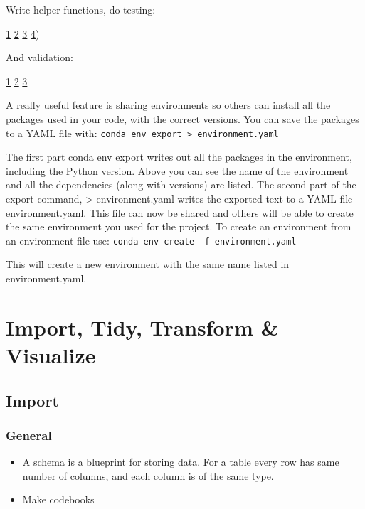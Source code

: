 \documentclass[]{book}
\begin{document}
Write helper functions, do testing:

\href{http://engineering.pivotal.io/post/test-driven-development-for-data-science/}{1}
\textbar{} \href{http://www.tdda.info/}{2} \textbar{}
\href{http://stochasticsolutions.com/}{3} \textbar{}
\href{https://github.com/ericmjl/data-testing-tutorial}{4})

And validation:

\href{https://github.com/data-cleaning/validate}{1} \textbar{}
\href{https://rdrr.io/cran/checkmate/}{2} \textbar{}
\href{https://github.com/shawnbrown/datatest}{3}

A really useful feature is sharing environments so others can install
all the packages used in your code, with the correct versions. You can
save the packages to a YAML file with:
\texttt{conda\ env\ export\ \textgreater{}\ environment.yaml}

The first part conda env export writes out all the packages in the
environment, including the Python version. Above you can see the name of
the environment and all the dependencies (along with versions) are
listed. The second part of the export command, \textgreater{}
environment.yaml writes the exported text to a YAML file
environment.yaml. This file can now be shared and others will be able to
create the same environment you used for the project. To create an
environment from an environment file use:
\texttt{conda\ env\ create\ -f\ environment.yaml}

This will create a new environment with the same name listed in
environment.yaml.

\chapter{Import, Tidy, Transform \&
Visualize}\label{import-tidy-transform-visualize}

\section{Import}\label{import-1}

\subsection{General}\label{general}

\begin{itemize}
\item
  A schema is a blueprint for storing data. For a table every row has
  same number of columns, and each column is of the same type.
\item
  Make codebooks
\end{itemize}
\end{document}
